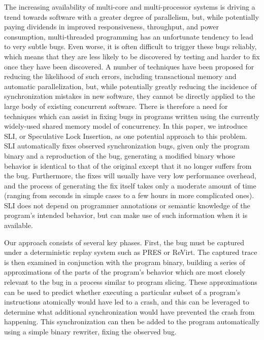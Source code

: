 \documentclass[10pt,twocolumn,preprint,natbib,authoryear]{sigplanconf}
\begin{document}
The increasing availability of multi-core and multi-processor systems
is driving a trend towards software with a greater degree of
parallelism, but, while potentially paying dividends in improved
responsiveness, throughput, and power consumption, multi-threaded
programming has an unfortunate tendency to lead to very subtle bugs.
Even worse, it is often difficult to trigger these bugs reliably,
which means that they are less likely to be discovered by testing and
harder to fix once they have been discovered.  A number of techniques
have been proposed for reducing the likelihood of such errors,
including transactional memory\cite{Shavit1997} and automatic
parallelization\cite{Bacon1994}, but, while potentially greatly
reducing the incidence of synchronization mistakes in new software,
they cannot be directly applied to the large body of existing
concurrent software.  There is therefore a need for techniques which
can assist in fixing bugs in programs written using the currently
widely-used shared memory model of concurrency.  In this paper, we
introduce SLI, or Speculative Lock Insertion, as one potential
approach to this problem.  SLI automatically fixes observed
synchronization bugs, given only the program binary and a reproduction
of the bug, generating a modified binary whose behavior is identical
to that of the original except that it no longer suffers from the bug.
Furthermore, the fixes will usually have very low performance
overhead, and the process of generating the fix itself takes only a
moderate amount of time (ranging from seconds in simple cases to a few
hours in more complicated ones).  SLI does not depend on programmer
annotations or semantic knowledge of the program's intended behavior,
but can make use of such information when it is available.

Our approach consists of several key phases.  First, the bug must be
captured under a deterministic replay system such as
PRES\cite{Park2009} or ReVirt\cite{Dunlap2002}.  The captured trace is
then examined in conjunction with the program binary, building a
series of approximations of the parts of the program's behavior which
are most closely relevant to the bug in a process similar to program
slicing\cite{Weiser1979}.  These approximations can be used to predict
whether executing a particular subset of a program's instructions
atomically would have led to a crash, and this can be leveraged to
determine what additional synchronization would have prevented the
crash from happening.  This synchronization can then be added to the
program automatically using a simple binary rewriter, fixing the
observed bug.
\end{document}
